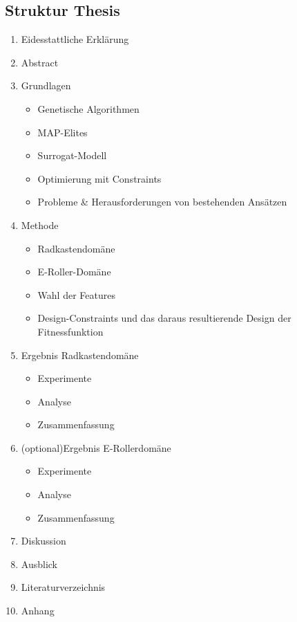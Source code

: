 \documentclass[12pt]{article}
\begin{document}
\begin{appendix}
\section{Struktur Thesis}

\begin{enumerate}
	\item Eidesstattliche Erklärung
	\item Abstract
	\item Grundlagen
	\begin{itemize}
		\item Genetische Algorithmen
		\item MAP-Elites
		\item Surrogat-Modell
		\item Optimierung mit Constraints
		\item Probleme \& Herausforderungen von bestehenden Ansätzen
	\end{itemize}
\item Methode
\begin{itemize}
	\item Radkastendomäne
	\item E-Roller-Domäne
	\item Wahl der Features
	\item Design-Constraints und das daraus resultierende Design der Fitnessfunktion
\end{itemize}
\item Ergebnis Radkastendomäne
\begin{itemize}
	\item Experimente
	\item Analyse
	\item Zusammenfassung
\end{itemize}
\item (optional)Ergebnis E-Rollerdomäne
\begin{itemize}
	\item Experimente
	\item Analyse
	\item Zusammenfassung
\end{itemize}
\item Diskussion
\item Ausblick
\item Literaturverzeichnis
\item Anhang
\end{enumerate}


\end{appendix}
\end{document}
